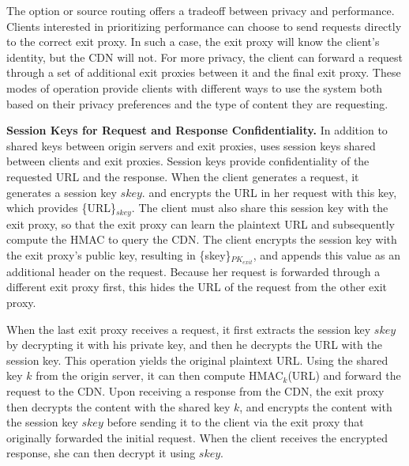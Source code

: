 The option or source routing offers a tradeoff between privacy and performance. Clients interested in prioritizing performance can choose to send requests directly to the correct exit proxy. In such a case, the exit proxy will know the client's identity, but the CDN will not. For more privacy, the client can forward a request through a set of additional exit proxies between it and the final exit proxy. %
These modes of operation provide clients with different ways to use the system both based on their privacy preferences and the type of content they are requesting.


\textbf{Session Keys for Request and Response Confidentiality.}
In addition to shared keys between origin servers and exit proxies, \system{} uses session keys shared 
between clients and exit proxies.  Session keys provide confidentiality of the requested URL and the 
response.  When the client generates a request, it generates a session key $skey$.
and encrypts 
the URL in her request with this key, which provides \{URL\}$_{skey}$.  The client
must also share this session key
with the exit proxy, so that the exit proxy can learn the plaintext URL and subsequently compute the HMAC to 
query the CDN.  The client encrypts the session key with the exit proxy's public key, resulting in \{skey\}$_{PK_{exit}}$, 
and appends this value as an additional header on the request.  Because her request is forwarded through a different exit proxy first, this hides the URL of the request from the other exit proxy.

When the last exit proxy receives a request, it first extracts the session
key $skey$ by decrypting it with 
his private key, and then he decrypts the URL with the session key.  This operation
yields the original plaintext
URL. Using the shared key $k$ from the origin server, it can then compute
HMAC$_k$(URL) and forward the request 
to the CDN.  Upon receiving a response from the CDN, the exit proxy then decrypts
the content with the shared key $k$, and
encrypts the content with the session key $skey$ before sending it to the client via the exit proxy that originally forwarded the initial request.
When the client receives the encrypted response, 
she can then decrypt it using $skey$.

